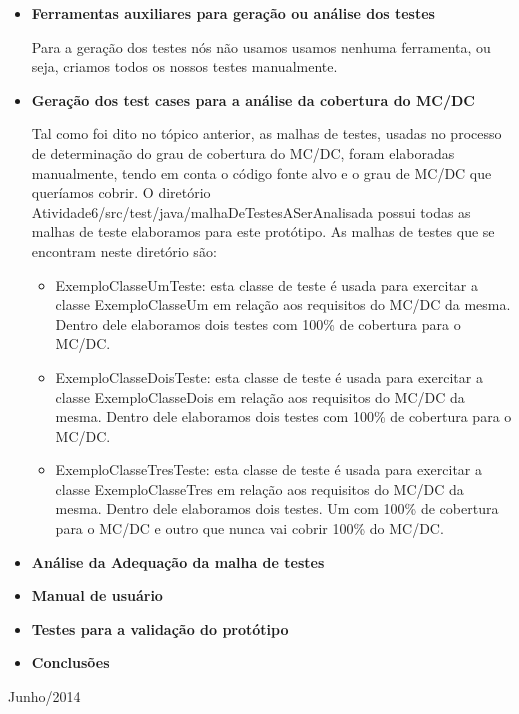 \documentclass[a4paper,11pt]{article}
\newcommand{\sepitem}{\vspace{0.1in}\item}
\begin{document}
\begin{itemize}

\sepitem \textbf{Ferramentas auxiliares para geração ou análise dos testes}
\setlength{\parindent}{5ex} 

Para a geração dos testes nós não usamos usamos nenhuma ferramenta, ou seja, criamos todos os nossos 
testes manualmente.

\sepitem \textbf{Geração dos test cases para a análise da cobertura do MC/DC}
\setlength{\parindent}{5ex}

Tal como foi dito no tópico anterior, as malhas de testes, usadas no processo de determinação do grau 
de cobertura do MC/DC, foram elaboradas manualmente, tendo em conta o código fonte alvo e o grau de 
MC/DC que queríamos cobrir. O diretório Atividade6/src/test/java/malhaDeTestesASerAnalisada possui 
todas as malhas de teste elaboramos para este protótipo. As malhas de testes que se encontram neste 
diretório são:

\begin{itemize}
\item ExemploClasseUmTeste: esta classe de teste é usada para exercitar a classe ExemploClasseUm 
em relação aos requisitos do MC/DC da mesma. Dentro dele elaboramos dois testes com 100\% de 
cobertura para o MC/DC.
\item ExemploClasseDoisTeste: esta classe de teste é usada para exercitar a classe ExemploClasseDois 
em relação aos requisitos do MC/DC da mesma. Dentro dele elaboramos dois testes com 100\% de 
cobertura para o MC/DC.
\item ExemploClasseTresTeste: esta classe de teste é usada para exercitar a classe ExemploClasseTres 
em relação aos requisitos do MC/DC da mesma. Dentro dele elaboramos dois testes. Um com 100\% de 
cobertura para o MC/DC e outro que nunca vai cobrir 100\% do MC/DC. 
\end{itemize}

\sepitem \textbf{Análise da Adequação da malha de testes}
\setlength{\parindent}{5ex}

\sepitem \textbf{Manual de usuário}
\setlength{\parindent}{5ex}

\sepitem \textbf{Testes para a validação do protótipo}
\setlength{\parindent}{5ex}

\sepitem \textbf{Conclusões}
\setlength{\parindent}{5ex}

\end{itemize}

\vfill

\raggedleft
{\sc Junho/2014}
\end{document}
